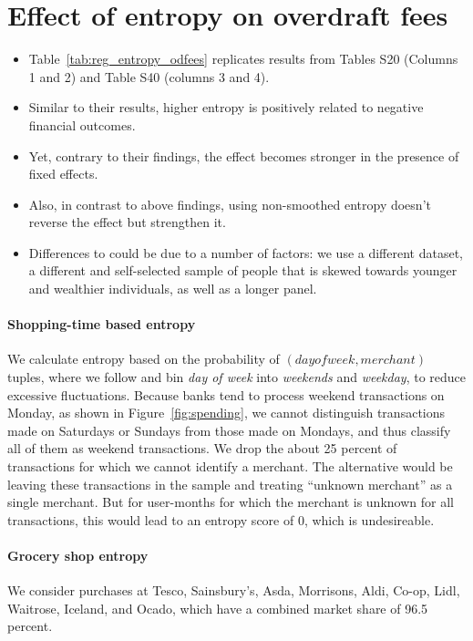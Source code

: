



\section{Effect of entropy on overdraft fees}%
\label{sub:effect_of_entropy_on_overdraft_fees}

\begin{itemize}

    \item Table~\ref{tab:reg_entropy_odfees} replicates results from
        \citet{muggleton2020evidence} Tables S20 (Columns 1 and 2) and Table
        S40 (columns 3 and 4).

    \item Similar to their results, higher entropy is positively related to
        negative financial outcomes.

    \item Yet, contrary to their findings, the effect becomes stronger in the
        presence of fixed effects.

    \item Also, in contrast to above findings, using non-smoothed entropy
        doesn't reverse the effect but strengthen it.

    \item Differences to \citet{muggleton2020evidence} could be due to a number
        of factors: we use a different dataset, a different and self-selected sample of people
        that is skewed towards younger and wealthier individuals, as well as a
        longer panel.

\end{itemize}




\paragraph{Shopping-time based entropy}
\label{par:shopping_time_based_entropy}

We calculate entropy based on the probability of $(day of week, merchant)$
tuples, where we follow \citet{guidotti2015behavioral} and bin \textit{day of
week} into \textit{weekends} and \textit{weekday}, to reduce excessive
fluctuations. Because banks tend to process weekend transactions on Monday, as
shown in Figure~\ref{fig:spending}, we cannot distinguish transactions made on
Saturdays or Sundays from those made on Mondays, and thus classify all of them
as weekend transactions. We drop the about 25 percent of transactions for which
we cannot identify a merchant. The alternative would be leaving these
transactions in the sample and treating ``unknown merchant'' as a single
merchant. But for user-months for which the merchant is unknown for all
transactions, this would lead to an entropy score of 0, which is undesireable.

\paragraph{Grocery shop entropy}%
\label{par:grocery_shop_entropy}

We consider purchases at Tesco, Sainsbury's, Asda, Morrisons, Aldi, Co-op,
Lidl, Waitrose, Iceland, and Ocado, which have a combined market share of 96.5
percent.

